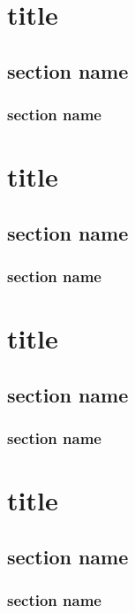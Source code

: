 \documentclass{memoir}
\begin{document}
\tableofcontents


\chapter{title}
\section{section name}
\subsection{section name}

\chapter{title}
\section{section name}
\subsection{section name}


\chapter{title}
\section{section name}
\subsection{section name}

\chapter{title}
\section{section name}
\subsection{section name}
\end{document}
